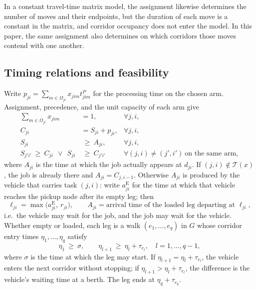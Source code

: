 In a constant travel-time matrix model, the assignment likewise determines the number of moves and their endpoints, but the duration of each move is a constant in the matrix, and corridor occupancy does not enter the model.
In this paper, the same assignment also determines on which corridors those moves contend with one another.

\subsection{Timing relations and feasibility}

Write $p_{ji}=\sum_{m\in\Omega_{ji}}x_{jim}t^P_{jim}$ for the processing time on the chosen arm. Assignment, precedence, and
the unit capacity of each arm give
\begin{align}
\sum_{m\in\Omega_{ji}} x_{jim} &= 1, & \forall j,i,
\label{eq:assign}\\
C_{ji} &= S_{ji}+p_{ji}, & \forall j,i,
\label{eq:dur}\\
S_{ji} &\ \ge\ A_{ji}, & \forall j,i,
\label{eq:material}\\
S_{j'i'}\ \ge\ C_{ji}\ \ \vee\ \ S_{ji} &\ \ge\ C_{j'i'}
& \forall (j,i)\neq(j',i')\ \text{on the same arm},
\label{eq:disj}
\end{align}
where $A_{ji}$ is the time at which the job actually appears at $d_{ji}$. If $(j,i)\notin\mathcal{T}(x)$, the job is
already there and $A_{ji}=C_{j,i-1}$. Otherwise $A_{ji}$ is produced by the vehicle that carries task $(j,i)$: write
$a^{\mathrm{E}}_{ji}$ for the time at which that vehicle reaches the pickup node after its empty leg; then
\begin{equation}
\label{eq:load}
\ell_{ji}=\max\bigl(a^{\mathrm{E}}_{ji},\ r_{ji}\bigr),
\qquad
A_{ji}=\text{arrival time of the loaded leg departing at } \ell_{ji},
\end{equation}
i.e.\ the vehicle may wait for the job, and the job may wait for the vehicle. Whether empty or loaded, each leg is a walk
$(e_1,\dots,e_q)$ in $G$ whose corridor entry times $\eta_1,\dots,\eta_q$ satisfy
\begin{equation}
\label{eq:walk}
\eta_1 \ \ge\ \sigma, \qquad
\eta_{l+1}\ \ge\ \eta_l+\tau_{e_l}, \quad l=1,\dots,q-1,
\end{equation}
where $\sigma$ is the time at which the leg may start.
If $\eta_{l+1}=\eta_l+\tau_{e_l}$, the vehicle enters the next corridor without stopping; if $\eta_{l+1}>\eta_l+\tau_{e_l}$, the difference is the vehicle's waiting time at a berth. The leg ends at $\eta_q+\tau_{e_q}$.
